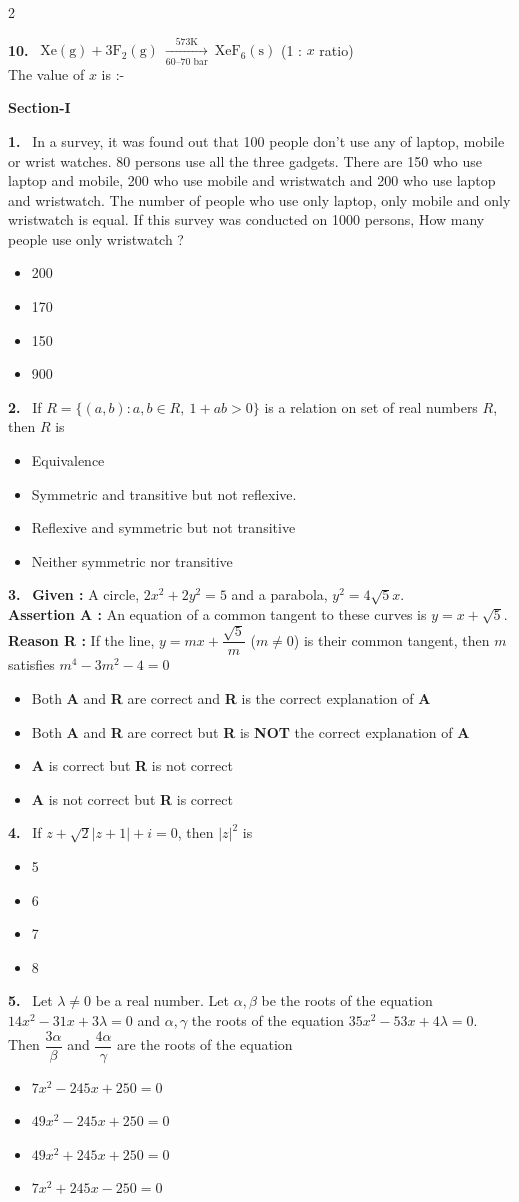 \documentclass[10pt]{extarticle}
\newcommand{\partsec}[2]{\par\medskip\noindent{\large\bfseries PART-#1: #2}\par\smallskip}
\newcommand{\sect}[1]{\par\smallskip\noindent\textbf{#1}\par}
\newcommand{\qn}[1]{\par\smallskip\noindent\textbf{#1.}~}
\newenvironment{qoptions}{\begin{itemize}[leftmargin=1.8em,itemsep=1pt,topsep=2pt,label={}]}{\end{itemize}}
\newcommand{\opt}[2]{\item[(#1)] #2}
\begin{document}
\begin{multicols}{2}
\qn{10} $\mathrm{Xe(g)+3F_2(g)}\ \xrightarrow[\text{60--70 bar}]{\text{573K}}\ \mathrm{XeF_6(s)}$ \quad (1 : $x$ ratio)\\
The value of $x$ is :-

\partsec{3}{MATHEMATICS}
\sect{Section-I}

\qn{1} In a survey, it was found out that 100 people don't use any of laptop, mobile or wrist watches. 80 persons use all the three gadgets. There are 150 who use laptop and mobile, 200 who use mobile and wristwatch and 200 who use laptop and wristwatch. The number of people who use only laptop, only mobile and only wristwatch is equal. If this survey was conducted on 1000 persons, How many people use only wristwatch ?
\begin{qoptions}
\opt{A}{200}
\opt{B}{170}
\opt{C}{150}
\opt{D}{900}
\end{qoptions}

\qn{2} If $R=\{(a,b):a,b\in R,\ 1+ab>0\}$ is a relation on set of real numbers $R$, then $R$ is
\begin{qoptions}
\opt{A}{Equivalence}
\opt{B}{Symmetric and transitive but not reflexive.}
\opt{C}{Reflexive and symmetric but not transitive}
\opt{D}{Neither symmetric nor transitive}
\end{qoptions}

\qn{3} \textbf{Given :} A circle, $2x^2+2y^2=5$ and a parabola, $y^2=4\sqrt5x$.\\
\textbf{Assertion A :} An equation of a common tangent to these curves is $y=x+\sqrt5$.\\
\textbf{Reason R :} If the line, $y=mx+\dfrac{\sqrt5}{m}$ ($m\neq0$) is their common tangent, then $m$ satisfies $m^4-3m^2-4=0$
\begin{qoptions}
\opt{A}{Both \textbf{A} and \textbf{R} are correct and \textbf{R} is the correct explanation of \textbf{A}}
\opt{B}{Both \textbf{A} and \textbf{R} are correct but \textbf{R} is \textbf{NOT} the correct explanation of \textbf{A}}
\opt{C}{\textbf{A} is correct but \textbf{R} is not correct}
\opt{D}{\textbf{A} is not correct but \textbf{R} is correct}
\end{qoptions}

\qn{4} If $z+\sqrt2|z+1|+i=0$, then $|z|^2$ is
\begin{qoptions}
\opt{A}{5}
\opt{B}{6}
\opt{C}{7}
\opt{D}{8}
\end{qoptions}

\qn{5} Let $\lambda\neq0$ be a real number. Let $\alpha,\beta$ be the roots of the equation $14x^2-31x+3\lambda=0$ and $\alpha,\gamma$ the roots of the equation $35x^2-53x+4\lambda=0$. Then $\dfrac{3\alpha}{\beta}$ and $\dfrac{4\alpha}{\gamma}$ are the roots of the equation
\begin{qoptions}
\opt{A}{$7x^2-245x+250=0$}
\opt{B}{$49x^2-245x+250=0$}
\opt{C}{$49x^2+245x+250=0$}
\opt{D}{$7x^2+245x-250=0$}
\end{qoptions}


\end{multicols}
\end{document}
